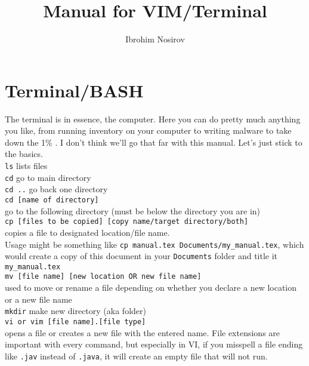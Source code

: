 \documentclass{article}[12pt]
\title{Manual for VIM/Terminal}
\author{Ibrohim Nosirov}
\begin{document}
\maketitle

\section{Terminal/BASH}
The terminal is in essence, the computer. Here you can do pretty much anything you like, from running inventory on your computer to writing malware to take down the 1\% \smiley{}.
I don't think we'll go that far with this manual.
Let's just stick to the basics.\\

\verb|ls|\hspace{1in} lists files\\

\verb|cd|\hspace{1in} go to main directory\\

\verb|cd ..| \hspace{1in}go back one directory\\

\verb|cd [name of directory]|\\ 
go to the following directory (must be below the directory you are in)\\

\verb|cp [files to be copied] [copy name/target directory/both]|\\
copies a file to designated location/file name.\\
Usage might be something like \verb|cp manual.tex Documents/my_manual.tex|, which would create a copy of this document in your \verb|Documents| folder and title it \verb|my_manual.tex|\\

\verb|mv [file name] [new location OR new file name]|\\
 used to move or rename a file depending on whether you declare a new location or a new file name\\

\verb|mkdir| \hspace{1in} make new directory (aka folder)\\

\verb|vi or vim [file name].[file type]|\\
opens a file or creates a new file with the entered name. File extensions are important with every command, but especially in VI, if you misspell a file ending like \verb|.jav| instead of \verb|.java|, it will create an empty file that will not run.\\
\end{document}
